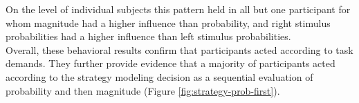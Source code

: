 On the level of individual subjects this pattern held in all but one participant for whom magnitude had a higher influence than probability, and right stimulus probabilities had a higher influence than left stimulus probabilities.\\
Overall, these behavioral results confirm that participants acted according to task demands.
They further provide evidence that a majority of participants acted according to the strategy modeling decision as a sequential evaluation of probability and then magnitude (Figure \ref{fig:strategy-prob-first}).




